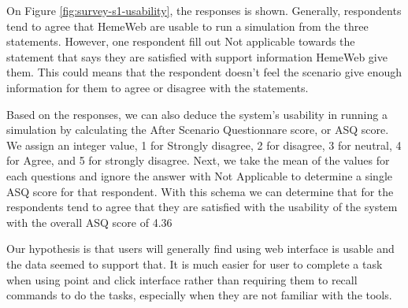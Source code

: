 \noindent%
\begin{minipage}{\linewidth}%
 \label{fig:survey-s1-usability}%
\end{minipage}

On Figure \ref{fig:survey-s1-usability}, the responses is shown. Generally, respondents tend to agree that HemeWeb are usable to run a simulation from the three statements. However, one respondent fill out Not applicable towards the statement that says they are satisfied with support information HemeWeb give them. This could means that the respondent doesn't feel the scenario give enough information for them to agree or disagree with the statements.

Based on the responses, we can also deduce the system's usability in running a simulation by calculating the After Scenario Questionnare score, or ASQ score. We assign an integer value, 1 for Strongly disagree, 2 for disagree, 3 for neutral, 4 for Agree, and 5 for strongly disagree. Next, we take the mean of the values for each questions and ignore the answer with Not Applicable to determine a single ASQ score for that respondent. With this schema we can determine that for the respondents tend to agree that they are satisfied with the usability of the system with the overall ASQ score of 4.36

Our hypothesis is that users will generally find using web interface is usable and the data seemed to support that. It is much easier for user to complete a task when using point and click interface rather than requiring them to recall commands to do the tasks, especially when they are not familiar with the tools.



